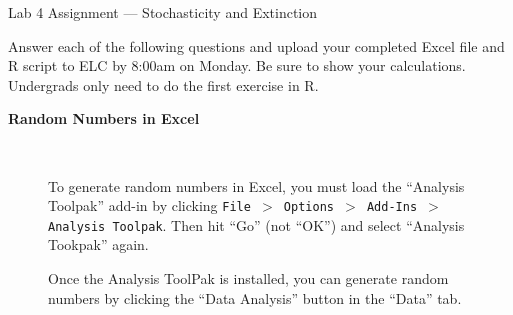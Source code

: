 \documentclass[12pt]{article}\usepackage[]{graphicx}\usepackage[]{xcolor}
\begin{document}
{
  \Large
  \centering
  Lab 4 Assignment --- Stochasticity and Extinction \par
  \normalsize
  Answer each of the following questions and upload your completed Excel
  file and R script to ELC by 8:00am on Monday. Be sure to show your
  calculations. \\
  Undergrads only need to do the first exercise in R. \\
}

\vspace{12pt}

{\bf Random Numbers in Excel \\}

\begin{figure}[h]
  \centering
   \\
  \caption{To generate random numbers in Excel, you must load the
    ``Analysis Toolpak'' add-in by clicking
    {\tt File $>$ Options $>$ Add-Ins $>$ Analysis Toolpak}. Then hit
    ``Go'' (not ``OK'') and select ``Analysis Tookpak'' again.}
  \label{fig:rng}
\end{figure}

\clearpage

\begin{figure}[h]
  \centering
  \caption{\footnotesize Once the Analysis ToolPak is installed, you can generate
    random numbers by clicking the ``Data Analysis'' button in the
    ``Data'' tab.
  }
  \label{fig:rng-2}
\end{figure}
\end{document}
